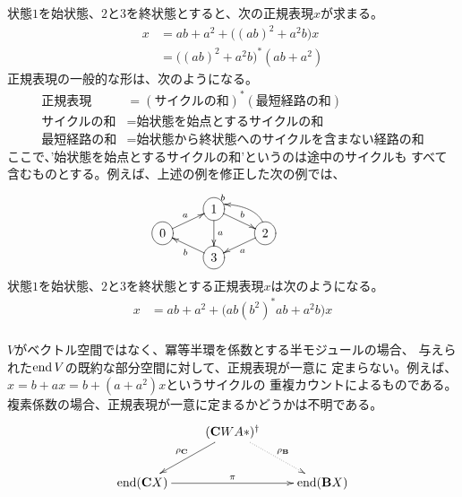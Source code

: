			状態$1$を始状態、$2$と$3$を終状態とすると、次の正規表現$x$が求まる。
			\begin{equation*}\begin{split} %
				x &= ab + a^2 + \bigl((ab)^2 + a^2b\bigr)x \\
				&= \bigl((ab)^2 + a^2b\bigr)^*(ab + a^2)
			\end{split}\end{equation*} %
			正規表現の一般的な形は、次のようになる。
			\begin{equation*}\begin{split} %
				\text{正規表現} 
				&= (\text{サイクルの和})^*(\text{最短経路の和}) \\
				\text{サイクルの和}
				&= \text{始状態を始点とするサイクルの和} \\
				\text{最短経路の和}
				&= \text{始状態から終状態へのサイクルを含まない経路の和}
			\end{split}\end{equation*} %
			ここで、'始状態を始点とするサイクルの和'というのは途中のサイクルも
			すべて含むものとする。例えば、上述の例を修正した次の例では、
			\begin{equation*}\xymatrix@R=1pt{
				& *++[o][F-]{1}\ar[rd]^b\ar[dd]^a \\
				*++[o][F-]{0}\ar[ru]^a 
				& & *++[o][F-]{2}\ar[ld]^a\ar@(u,l)[lu]_b & \\
				& *++[o][F-]{3}\ar[lu]^b \\
			}\end{equation*}
			状態$1$を始状態、$2$と$3$を終状態とする正規表現$x$は次のようになる。
			\begin{equation*}\begin{split} %
				x &= ab + a^2 + \bigl(ab(b^2)^*ab + a^2b\bigr)x \\
			\end{split}\end{equation*} %

			\begin{note}[サイクルの重複]\label{note:サイクルの重複} %
				$V$がベクトル空間ではなく、冪等半環を係数とする半モジュールの場合、
				与えられた$\operatorname{end}V$の既約な部分空間に対して、正規表現が一意に
				定まらない。例えば、$x=b+ax=b+(a+a^2)x$というサイクルの
				重複カウントによるものである。
				複素係数の場合、正規表現が一意に定まるかどうかは不明である。
				\begin{equation*}\xymatrix{
					& (\mybf{C}WA*)^\dag \ar[ld]_{\rho_\mybf{C}}
						\ar@{.>}[rd]^{\rho_\mybf{B}} \\
					\myop{end}(\mybf{C}X) \ar[rr]^{\pi} & & \myop{end}(\mybf{B}X)
				}\end{equation*}
			\end{note} %

